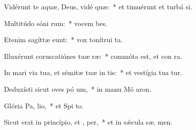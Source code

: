 \item Vidérunt te aquæ, Deus, vidé  quæ:~* et timuérunt et turbá  si.
\item Multitúdo sóni rum:~* vocem  bes.
\item Etenim sagíttæ  eunt:~* vox tonítrui   ta.
\item Illuxérunt coruscatiónes tuæ  ræ:~* commóta est, et con ra.
\item In mari via tua, et sémitæ tuæ in  tis:~* et vestígia tua  tur.
\item Deduxísti sicut oves pó um,~* in manu Mó  aron.
\item Glória Pa,  lio,~* et Spi to.
\item Sicut erat in princípio, et ,  per,~* et in sǽcula sæ. men.
